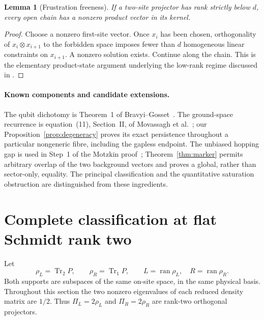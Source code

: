 \documentclass[11pt,a4paper]{article}
\newtheorem{lemma}[theorem]{Lemma}
\theoremstyle{remark}\newtheorem{remark}[theorem]{Remark}
\newcommand{\ran}{\operatorname{ran}}
\begin{document}
\begin{lemma}[Frustration freeness]\label{lem:ff}
If a two-site projector has rank strictly below $d$, every open chain has a nonzero product vector in its kernel.
\end{lemma}
\begin{proof}
Choose a nonzero first-site vector. Once $x_i$ has been chosen, orthogonality of $x_i\otimes x_{i+1}$ to the forbidden space imposes fewer than $d$ homogeneous linear constraints on $x_{i+1}$. A nonzero solution exists. Continue along the chain. This is the elementary product-state argument underlying the low-rank regime discussed in \cite{Mov}.
\end{proof}

\paragraph{Known components and candidate extensions.}
The qubit dichotomy is Theorem~1 of Bravyi--Gosset~\cite{BG}.
The ground-space recurrence is equation~(11), Section~II, of
Movassagh et al.~\cite{Mov}; our Proposition~\ref{prop:degeneracy}
proves its exact persistence throughout a particular nongeneric fibre,
including the gapless endpoint. The unbiased hopping gap is used in Step~1
of the Motzkin proof~\cite{Motzkin}; Theorem~\ref{thm:marker} permits
arbitrary overlap of the two background vectors and proves a global,
rather than sector-only, equality. The principal classification and the
quantitative saturation obstruction are distinguished from these ingredients.

\section{Complete classification at flat Schmidt rank two}\label{sec:main}
Let
\[
 \rho_L=\operatorname{Tr}_2 P,\qquad \rho_R=\operatorname{Tr}_1 P,
 \qquad L=\ran\rho_L,\quad R=\ran\rho_R.
\]
Both supports are subspaces of the same on-site space, in the same physical basis. Throughout this section the two nonzero eigenvalues of each reduced density matrix are $1/2$. Thus $\Pi_L=2\rho_L$ and $\Pi_R=2\rho_R$ are rank-two orthogonal projectors.
\end{document}
